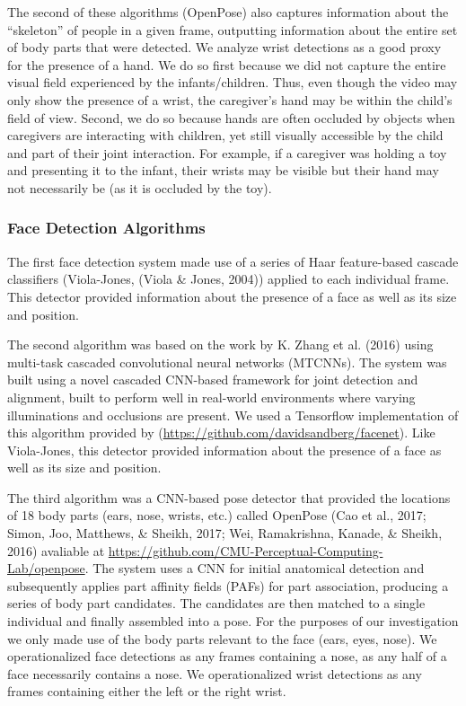 \documentclass[10pt, letterpaper]{article}
\begin{document}
The second of these algorithms (OpenPose) also captures information
about the ``skeleton'' of people in a given frame, outputting
information about the entire set of body parts that were detected. We
analyze wrist detections as a good proxy for the presence of a hand. We
do so first because we did not capture the entire visual field
experienced by the infants/children. Thus, even though the video may
only show the presence of a wrist, the caregiver's hand may be within
the child's field of view. Second, we do so because hands are often
occluded by objects when caregivers are interacting with children, yet
still visually accessible by the child and part of their joint
interaction. For example, if a caregiver was holding a toy and
presenting it to the infant, their wrists may be visible but their hand
may not necessarily be (as it is occluded by the toy).

\subsubsection{Face Detection
Algorithms}\label{face-detection-algorithms}

The first face detection system made use of a series of Haar
feature-based cascade classifiers (Viola-Jones, (Viola \& Jones, 2004))
applied to each individual frame. This detector provided information
about the presence of a face as well as its size and position.

The second algorithm was based on the work by K. Zhang et al. (2016)
using multi-task cascaded convolutional neural networks (MTCNNs). The
system was built using a novel cascaded CNN-based framework for joint
detection and alignment, built to perform well in real-world
environments where varying illuminations and occlusions are present. We
used a Tensorflow implementation of this algorithm provided by
(\url{https://github.com/davidsandberg/facenet}). Like Viola-Jones, this
detector provided information about the presence of a face as well as
its size and position.

The third algorithm was a CNN-based pose detector that provided the
locations of 18 body parts (ears, nose, wrists, etc.) called OpenPose
(Cao et al., 2017; Simon, Joo, Matthews, \& Sheikh, 2017; Wei,
Ramakrishna, Kanade, \& Sheikh, 2016) avaliable at
\url{https://github.com/CMU-Perceptual-Computing-Lab/openpose}. The
system uses a CNN for initial anatomical detection and subsequently
applies part affinity fields (PAFs) for part association, producing a
series of body part candidates. The candidates are then matched to a
single individual and finally assembled into a pose. For the purposes of
our investigation we only made use of the body parts relevant to the
face (ears, eyes, nose). We operationalized face detections as any
frames containing a nose, as any half of a face necessarily contains a
nose. We operationalized wrist detections as any frames containing
either the left or the right wrist.
\end{document}
